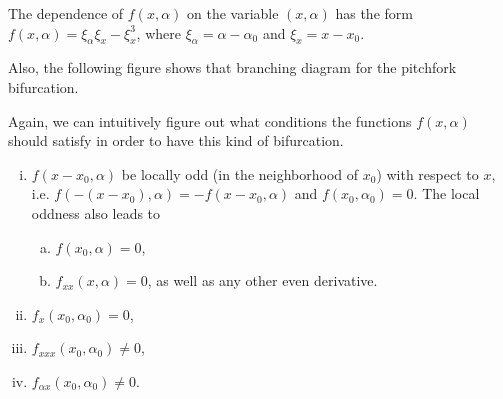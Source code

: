 The dependence of $f(x,\alpha)$ on the variable $(x,\alpha)$ has the form $f(x,\alpha) = \xi_\alpha \xi_x - \xi_x^3$, where $\xi_\alpha = \alpha - \alpha_0$ and $\xi_x = x - x_0$.

Also, the following figure shows that branching diagram for the pitchfork bifurcation.


Again, we can intuitively figure out what conditions the functions $f(x,\alpha)$ should satisfy in order to have this kind of bifurcation.

\begin{enumerate}[(i)]
	\item $f(x-x_0,\alpha)$ be locally odd (in the neighborhood of $x_0$) with respect to $x$, i.e. $f(-(x-x_0),\alpha) = - f(x-x_0,\alpha)$ and $f(x_0,\alpha_0) =0 $. The local oddness also leads to 
	\begin{enumerate}[(a)]
		\item $f(x_0,\alpha) = 0$,
		\item $f_{xx}(x,\alpha)=0$, as well as any other even derivative.
	\end{enumerate} 
	\item $f_x(x_0,\alpha_0) =0$,
	\item $f_{xxx}(x_0,\alpha_0) \neq 0$,
	\item $f_{\alpha x} (x_0,\alpha_0) \neq 0$.
\end{enumerate}


